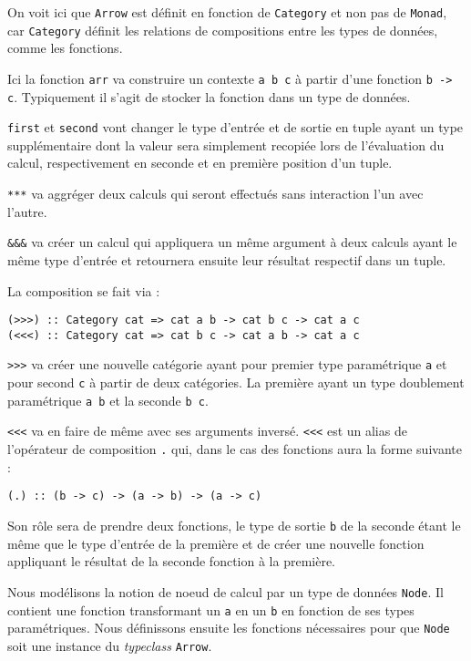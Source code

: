\documentclass{llncs}
\newcommand{\Arr}{\lstinline{Arrow} }
\newcommand{\Arrp}{\lstinline{Arrow}. }
\begin{document}
On voit ici que \Arr est définit en fonction de \lstinline{Category} et non pas
de \lstinline{Monad}, car \lstinline{Category} définit les relations de compositions entre
les types de données, comme les fonctions.

Ici la fonction \lstinline{arr} va construire un contexte \lstinline{a b c} à partir d'une
fonction \lstinline{b -> c}.
Typiquement il s'agit de stocker la fonction dans un type de données.

\lstinline{first} et \lstinline{second} vont changer le type d'entrée et de sortie
en tuple ayant un type supplémentaire dont la valeur sera simplement recopiée
lors de l'évaluation du calcul, respectivement en seconde et en première position
d'un tuple.

\lstinline{***} va aggréger deux calculs qui seront effectués sans interaction l'un
avec l'autre.

\lstinline{&&&} va créer un calcul qui appliquera un même argument à deux calculs ayant
le même type d'entrée et retournera ensuite leur résultat respectif dans un tuple.

La composition se fait via :
\begin{lstlisting}
(>>>) :: Category cat => cat a b -> cat b c -> cat a c
(<<<) :: Category cat => cat b c -> cat a b -> cat a c
\end{lstlisting}

\lstinline{>>>} va créer une nouvelle catégorie ayant pour premier type paramétrique
\lstinline{a} et pour second \lstinline{c} à partir de deux catégories.
La première ayant un type doublement paramétrique \lstinline{a b} et la seconde
\lstinline{b c}.

\lstinline{<<<} va en faire de même avec ses arguments inversé.
\lstinline{<<<} est un alias de l'opérateur de composition \lstinline{.} qui, dans le cas
des fonctions aura la forme suivante :
\begin{lstlisting}
(.) :: (b -> c) -> (a -> b) -> (a -> c)
\end{lstlisting}
Son rôle sera de prendre deux fonctions, le type de sortie \lstinline{b} de la seconde
étant le même que le type d'entrée de la première et de créer une nouvelle fonction
appliquant le résultat de la seconde fonction à la première.

Nous modélisons la notion de noeud de calcul par un type de données
\lstinline{Node}.
Il contient une fonction transformant un \lstinline{a} en un \lstinline{b} en fonction
de ses types paramétriques.
Nous définissons ensuite les fonctions nécessaires pour que \lstinline{Node} soit
une instance du \emph{typeclass} \Arrp
\end{document}
